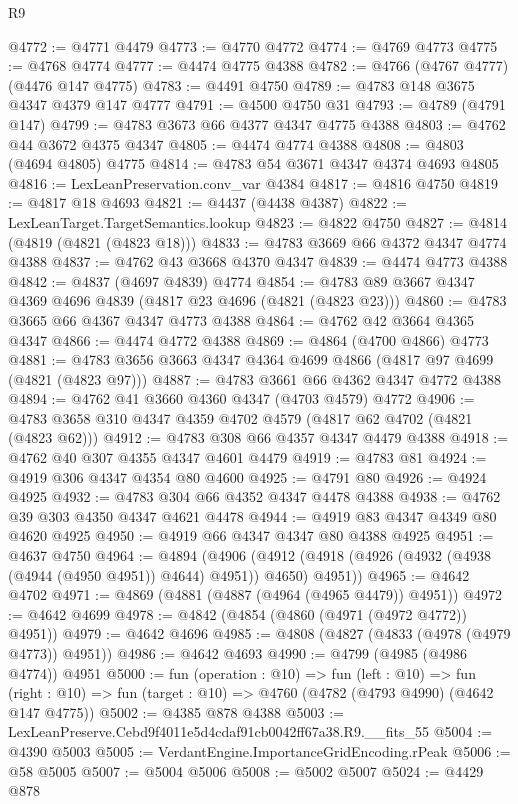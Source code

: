 \begin{lexlean}{R9}
\begin{coremodule}
@4772 := @4771 @4479
@4773 := @4770 @4772
@4774 := @4769 @4773
@4775 := @4768 @4774
@4777 := @4474 @4775 @4388
@4782 := @4766 (@4767 @4777) (@4476 @147 @4775)
@4783 := @4491 @4750
@4789 := @4783 @148 @3675 @4347 @4379 @147 @4777
@4791 := @4500 @4750 @31
@4793 := @4789 (@4791 @147)
@4799 := @4783 @3673 @66 @4377 @4347 @4775 @4388
@4803 := @4762 @44 @3672 @4375 @4347
@4805 := @4474 @4774 @4388
@4808 := @4803 (@4694 @4805) @4775
@4814 := @4783 @54 @3671 @4347 @4374 @4693 @4805
@4816 := LexLeanPreservation.conv_var @4384
@4817 := @4816 @4750
@4819 := @4817 @18 @4693
@4821 := @4437 (@4438 @4387)
@4822 := LexLeanTarget.TargetSemantics.lookup
@4823 := @4822 @4750
@4827 := @4814 (@4819 (@4821 (@4823 @18)))
@4833 := @4783 @3669 @66 @4372 @4347 @4774 @4388
@4837 := @4762 @43 @3668 @4370 @4347
@4839 := @4474 @4773 @4388
@4842 := @4837 (@4697 @4839) @4774
@4854 := @4783 @89 @3667 @4347 @4369 @4696 @4839 (@4817 @23 @4696 (@4821 (@4823 @23)))
@4860 := @4783 @3665 @66 @4367 @4347 @4773 @4388
@4864 := @4762 @42 @3664 @4365 @4347
@4866 := @4474 @4772 @4388
@4869 := @4864 (@4700 @4866) @4773
@4881 := @4783 @3656 @3663 @4347 @4364 @4699 @4866 (@4817 @97 @4699 (@4821 (@4823 @97)))
@4887 := @4783 @3661 @66 @4362 @4347 @4772 @4388
@4894 := @4762 @41 @3660 @4360 @4347 (@4703 @4579) @4772
@4906 := @4783 @3658 @310 @4347 @4359 @4702 @4579 (@4817 @62 @4702 (@4821 (@4823 @62)))
@4912 := @4783 @308 @66 @4357 @4347 @4479 @4388
@4918 := @4762 @40 @307 @4355 @4347 @4601 @4479
@4919 := @4783 @81
@4924 := @4919 @306 @4347 @4354 @80 @4600
@4925 := @4791 @80
@4926 := @4924 @4925
@4932 := @4783 @304 @66 @4352 @4347 @4478 @4388
@4938 := @4762 @39 @303 @4350 @4347 @4621 @4478
@4944 := @4919 @83 @4347 @4349 @80 @4620 @4925
@4950 := @4919 @66 @4347 @4347 @80 @4388 @4925
@4951 := @4637 @4750
@4964 := @4894
    (@4906 (@4912 (@4918 (@4926 (@4932 (@4938 (@4944 (@4950 @4951)) @4644) @4951)) @4650) @4951))
@4965 := @4642 @4702
@4971 := @4869 (@4881 (@4887 (@4964 (@4965 @4479)) @4951))
@4972 := @4642 @4699
@4978 := @4842 (@4854 (@4860 (@4971 (@4972 @4772)) @4951))
@4979 := @4642 @4696
@4985 := @4808 (@4827 (@4833 (@4978 (@4979 @4773)) @4951))
@4986 := @4642 @4693
@4990 := @4799 (@4985 (@4986 @4774)) @4951
@5000 := fun (operation : @10) =>
  fun (left : @10) =>
  fun (right : @10) => fun (target : @10) => @4760 (@4782 (@4793 @4990) (@4642 @147 @4775))
@5002 := @4385 @878 @4388
@5003 := LexLeanPreserve.Cebd9f4011e5d4cdaf91cb0042ff67a38.R9.__fits_55
@5004 := @4390 @5003
@5005 := VerdantEngine.ImportanceGridEncoding.rPeak
@5006 := @58 @5005
@5007 := @5004 @5006
@5008 := @5002 @5007
@5024 := @4429
    @878

\end{coremodule}
\end{lexlean}
